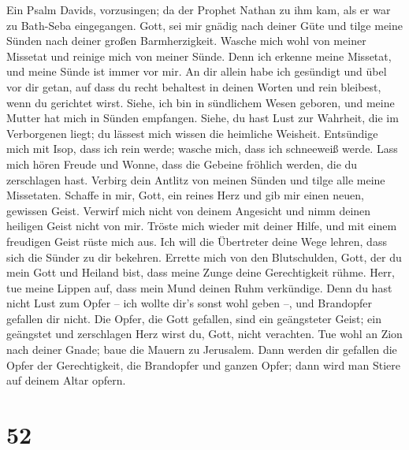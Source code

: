  Ein Psalm Davids, vorzusingen;  da der
Prophet Nathan zu ihm kam, als er war zu Bath-Seba eingegangen.
 Gott, sei mir gnädig nach deiner Güte und tilge meine
Sünden nach deiner großen Barmherzigkeit.  Wasche mich
wohl von meiner Missetat und reinige mich von meiner Sünde.
 Denn ich erkenne meine Missetat, und meine Sünde ist
immer vor mir.  An dir allein habe ich gesündigt und übel
vor dir getan, auf dass du recht behaltest in deinen Worten und rein
bleibest, wenn du gerichtet wirst.  Siehe, ich bin in
sündlichem Wesen geboren, und meine Mutter hat mich in Sünden empfangen.
 Siehe, du hast Lust zur Wahrheit, die im Verborgenen
liegt; du lässest mich wissen die heimliche Weisheit. 
Entsündige mich mit Isop, dass ich rein werde; wasche mich, dass ich
schneeweiß werde.  Lass mich hören Freude und Wonne, dass
die Gebeine fröhlich werden, die du zerschlagen hast. 
Verbirg dein Antlitz von meinen Sünden und tilge alle meine Missetaten.
 Schaffe in mir, Gott, ein reines Herz und gib mir einen
neuen, gewissen Geist.  Verwirf mich nicht von deinem
Angesicht und nimm deinen heiligen Geist nicht von mir. 
Tröste mich wieder mit deiner Hilfe, und mit einem freudigen Geist rüste
mich aus.  Ich will die Übertreter deine Wege lehren,
dass sich die Sünder zu dir bekehren.  Errette mich von
den Blutschulden, Gott, der du mein Gott und Heiland bist, dass meine
Zunge deine Gerechtigkeit rühme.  Herr, tue meine Lippen
auf, dass mein Mund deinen Ruhm verkündige.  Denn du hast
nicht Lust zum Opfer -- ich wollte dir's sonst wohl geben --, und
Brandopfer gefallen dir nicht.  Die Opfer, die Gott
gefallen, sind ein geängsteter Geist; ein geängstet und zerschlagen Herz
wirst du, Gott, nicht verachten.  Tue wohl an Zion nach
deiner Gnade; baue die Mauern zu Jerusalem.  Dann werden
dir gefallen die Opfer der Gerechtigkeit, die Brandopfer und ganzen
Opfer; dann wird man Stiere auf deinem Altar opfern.

\hypertarget{section-51}{%
\section{52}\label{section-51}}

